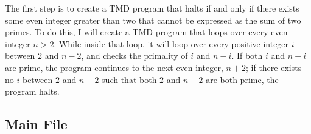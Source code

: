 The first step is to create a TMD program that halts if and only if there exists some even integer greater than two that cannot be expressed as the sum of two primes. To do this, I will create a TMD program that loops over every even integer $n > 2$. While inside that loop, it will loop over every positive integer $i$ between $2$ and $n-2$, and checks the primality of $i$ and $n-i$. If both $i$ and $n-i$ are prime, the program continues to the next even integer, $n+2$; if there exists no $i$ between $2$ and $n-2$ such that both $2$ and $n-2$ are both prime, the program halts. %

\subsection{Main File \label{sec:mainfilegoldbach}}

